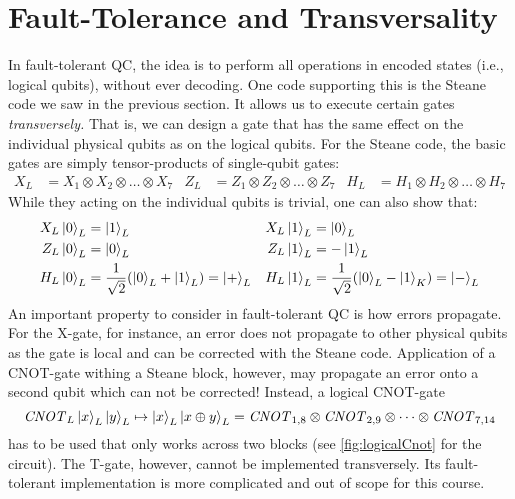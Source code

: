 	\section{Fault-Tolerance and Transversality} %
		\label{subsec:faultTolerance}

		In fault-tolerant \ac{QC}, the idea is to perform all operations in encoded states (i.e., logical qubits), without ever decoding. One code supporting this is the Steane code we saw in the previous section. It allows us to execute certain gates \emph{transversely.} That is, we can design a gate that has the same effect on the individual physical qubits as on the logical qubits. For the Steane code, the basic gates are simply tensor-products of single-qubit gates:
		\begin{align}
			X_L & = X_1 \otimes X_2 \otimes \dots \otimes X_7 &
			Z_L & = Z_1 \otimes Z_2 \otimes \dots \otimes Z_7 &
			H_L & = H_1 \otimes H_2 \otimes \dots \otimes H_7
		\end{align}
		While they acting on the individual qubits is trivial, one can also show that:
		\begin{align}
			X_L \ket{0}_L & =  \ket{1}_L                                             &
			X_L \ket{1}_L & =  \ket{0}_L                                               \\
			Z_L \ket{0}_L & =  \ket{0}_L                                             &
			Z_L \ket{1}_L & = -\ket{1}_L                                               \\
			H_L \ket{0}_L & = \frac{1}{\sqrt{2}} (\ket{0}_L + \ket{1}_L) = \ket{+}_L &
			H_L \ket{1}_L & = \frac{1}{\sqrt{2}} (\ket{0}_L - \ket{1}_K) = \ket{-}_L
		\end{align}
		An important property to consider in fault-tolerant \ac{QC} is how errors propagate. For the X-gate, for instance, an error does not propagate to other physical qubits as the gate is local and can be corrected with the Steane code. Application of a CNOT-gate withing a Steane block, however, may propagate an error onto a second qubit which can not be corrected! Instead, a logical CNOT-gate
		\begin{equation}
			\mathit{CNOT}_L \ket{x}_L \ket{y}_L \mapsto \ket{x}_L \ket{x \oplus y}_L = \mathit{CNOT}_{1, 8} \otimes \mathit{CNOT}_{2, 9} \otimes \dots \otimes \mathit{CNOT}_{7, 14}
		\end{equation}
		has to be used that only works across two blocks (see \autoref{fig:logicalCnot} for the circuit). The T-gate, however, cannot be implemented transversely. Its fault-tolerant implementation is more complicated and out of scope for this course.

